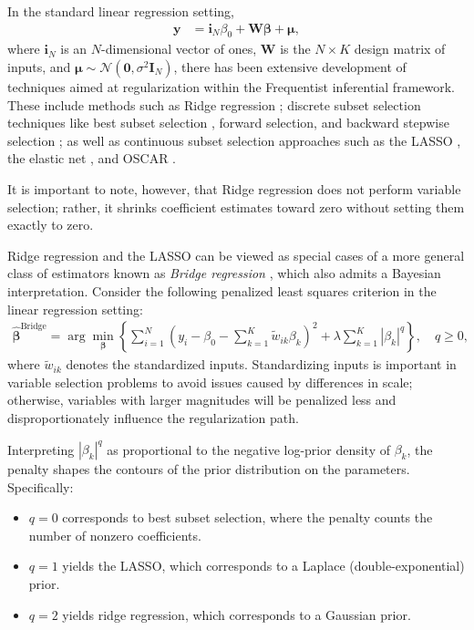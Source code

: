 In the standard linear regression setting,
\begin{align*}
	\mathbf{y} &= \mathbf{i}_N \beta_0 + \mathbf{W}\boldsymbol{\beta} + \boldsymbol{\mu},
\end{align*}
where \(\mathbf{i}_N\) is an \(N\)-dimensional vector of ones, \(\mathbf{W}\) is the \(N \times K\) design matrix of inputs, and \(\boldsymbol{\mu} \sim \mathcal{N}(\mathbf{0}, \sigma^2 \mathbf{I}_N)\), there has been extensive development of techniques aimed at regularization within the Frequentist inferential framework. These include methods such as Ridge regression \cite{hoerl1970ridge}; discrete subset selection techniques like best subset selection \cite{furnival1974regressions}, forward selection, and backward stepwise selection \cite{hastie2009elements}; as well as continuous subset selection approaches such as the LASSO \cite{tibshirani1996regression}, the elastic net \cite{zou2005regularization}, and OSCAR \cite{bondell2008simultaneous}.

It is important to note, however, that Ridge regression does not perform variable selection; rather, it shrinks coefficient estimates toward zero without setting them exactly to zero.

Ridge regression and the LASSO can be viewed as special cases of a more general class of estimators known as \textit{Bridge regression} \cite{fu1998penalized}, which also admits a Bayesian interpretation. Consider the following penalized least squares criterion in the linear regression setting:
\begin{align*}
	\hat{\boldsymbol{\beta}}^{\text{Bridge}} = \arg\min_{\boldsymbol{\beta}} \left\{ \sum_{i=1}^N \left( y_i - \beta_0 - \sum_{k=1}^K \tilde{w}_{ik} \beta_k \right)^2 + \lambda \sum_{k=1}^K |\beta_k|^q \right\}, \quad q \geq 0,
\end{align*}
where \(\tilde{w}_{ik}\) denotes the standardized inputs. Standardizing inputs is important in variable selection problems to avoid issues caused by differences in scale; otherwise, variables with larger magnitudes will be penalized less and disproportionately influence the regularization path.

Interpreting \( |\beta_k|^q \) as proportional to the negative log-prior density of \( \beta_k \), the penalty shapes the contours of the prior distribution on the parameters. Specifically:
\begin{itemize}
	\item \( q = 0 \) corresponds to best subset selection, where the penalty counts the number of nonzero coefficients.
	\item \( q = 1 \) yields the LASSO, which corresponds to a Laplace (double-exponential) prior.
	\item \( q = 2 \) yields ridge regression, which corresponds to a Gaussian prior.  
	 
\end{itemize}

